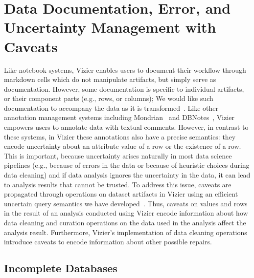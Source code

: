 
\section{Data Documentation, Error, and Uncertainty Management with Caveats}
\label{sec:data-docum-error}

Like notebook systems, Vizier enables users to document their workflow through markdown cells which do not manipulate artifacts, but simply serve as documentation. 
However, some documentation is specific to individual artifacts, or their component parts (e.g., rows, or columns); 
We would like such documentation to accompany the data as it is transformed~\cite{kumari:2021:cidr:datasense}.
Like other annotation management systems including Mondrian~\cite{GK05} and DBNotes~\cite{bhagwat-05-anmsrd},
Vizier empowers users to annotate data with textual comments. 
However, in contrast to these systems, in Vizier these annotations also have a precise semantics: they encode uncertainty about an attribute value of a row or the existence of a row. 
This is important, because uncertainty arises naturally in most data science pipelines (e.g., because of errors in the data or because of heuristic choices during data cleaning) and if data analysis ignores the uncertainty in the data, it can lead to analysis results that cannot be trusted.
To address this issue, caveats are propagated through operations on dataset artifacts in Vizier using an efficient uncertain query semantics we have developed~\cite{FH19, FH21}. 
Thus, caveats on values and rows in the result of an analysis conducted using Vizier encode information about how data cleaning and curation operations on the data used in the analysis affect the analysis result. 
Furthermore, Vizier's implementation of data cleaning operations introduce caveats to encode information about other possible repairs.

\subsection{Incomplete Databases}
\label{sec:incomplete-databases}

